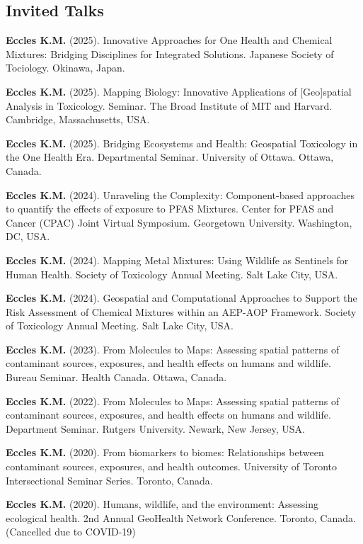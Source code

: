 \documentclass[margin,line]{res}
\begin{document}
\begin{resume}
\section{\sc Invited Talks}


\textbf{Eccles K.M.} (2025). Innovative Approaches for One Health and Chemical Mixtures: Bridging Disciplines for Integrated Solutions. Japanese Society of Tociology. Okinawa, Japan.

\textbf{Eccles K.M.} (2025). Mapping Biology: Innovative Applications of [Geo]spatial Analysis in Toxicology. Seminar. The Broad Institute of MIT and Harvard. Cambridge, Massachusetts, USA.

\textbf{Eccles K.M.} (2025). Bridging Ecosystems and Health: Geospatial Toxicology in the One Health Era. Departmental Seminar. University of Ottawa. Ottawa, Canada.

\textbf{Eccles K.M.} (2024). Unraveling the Complexity: Component-based approaches to quantify the effects of exposure to PFAS Mixtures. Center for PFAS and Cancer (CPAC) Joint Virtual Symposium. Georgetown University. Washington, DC, USA.

\textbf{Eccles K.M.} (2024). Mapping Metal Mixtures: Using Wildlife as Sentinels for Human Health. Society of Toxicology Annual Meeting. Salt Lake City, USA.

\textbf{Eccles K.M.} (2024). Geospatial and Computational Approaches to Support the Risk Assessment of Chemical Mixtures within an AEP-AOP Framework. Society of Toxicology Annual Meeting. Salt Lake City, USA.

\textbf{Eccles K.M.} (2023). From Molecules to Maps: Assessing spatial patterns of contaminant sources, exposures, and health effects on humans and wildlife. Bureau Seminar. Health Canada. Ottawa, Canada.

\textbf{Eccles K.M.} (2022). From Molecules to Maps: Assessing spatial patterns of contaminant sources, exposures, and health effects on humans and wildlife. Department Seminar. Rutgers University. Newark, New Jersey, USA.

\textbf{Eccles K.M.} (2020). From biomarkers to biomes: Relationships between contaminant sources, exposures, and health outcomes. University of Toronto Intersectional Seminar Series. Toronto, Canada.

\textbf{Eccles K.M.} (2020). Humans, wildlife, and the environment: Assessing ecological health. 2nd Annual GeoHealth Network Conference. Toronto, Canada. (Cancelled due to COVID-19)


\end{resume}
\end{document}
